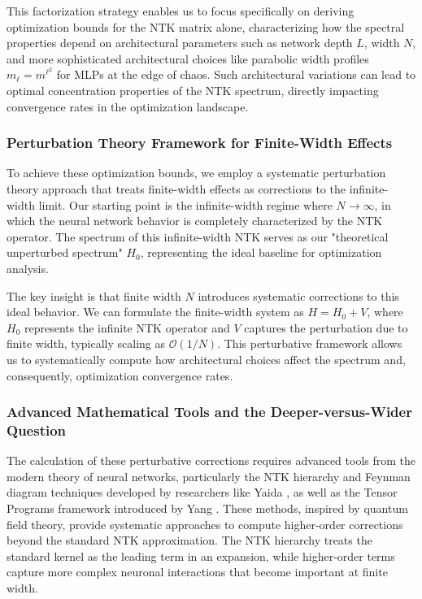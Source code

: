 \documentclass{article}
\begin{document}
This factorization strategy enables us to focus specifically on deriving optimization bounds for the NTK matrix alone, characterizing how the spectral properties depend on architectural parameters such as network depth $L$, width $N$, and more sophisticated architectural choices like parabolic width profiles $m_\ell = m^{\ell^2}$ for MLPs at the edge of chaos. Such architectural variations can lead to optimal concentration properties of the NTK spectrum, directly impacting convergence rates in the optimization landscape.

\subsubsection{Perturbation Theory Framework for Finite-Width Effects}

To achieve these optimization bounds, we employ a systematic perturbation theory approach that treats finite-width effects as corrections to the infinite-width limit. Our starting point is the infinite-width regime where $N \to \infty$, in which the neural network behavior is completely characterized by the NTK operator. The spectrum of this infinite-width NTK serves as our "theoretical unperturbed spectrum" $H_0$, representing the ideal baseline for optimization analysis.

The key insight is that finite width $N$ introduces systematic corrections to this ideal behavior. We can formulate the finite-width system as $H = H_0 + V$, where $H_0$ represents the infinite NTK operator and $V$ captures the perturbation due to finite width, typically scaling as $\mathcal{O}(1/N)$. This perturbative framework allows us to systematically compute how architectural choices affect the spectrum and, consequently, optimization convergence rates.

\subsubsection{Advanced Mathematical Tools and the Deeper-versus-Wider Question}

The calculation of these perturbative corrections requires advanced tools from the modern theory of neural networks, particularly the NTK hierarchy and Feynman diagram techniques developed by researchers like Yaida \cite{yaida2019non}, as well as the Tensor Programs framework introduced by Yang \cite{yang2019tensor,yang2020tensor}. These methods, inspired by quantum field theory, provide systematic approaches to compute higher-order corrections beyond the standard NTK approximation. The NTK hierarchy treats the standard kernel as the leading term in an expansion, while higher-order terms capture more complex neuronal interactions that become important at finite width.
\end{document}
